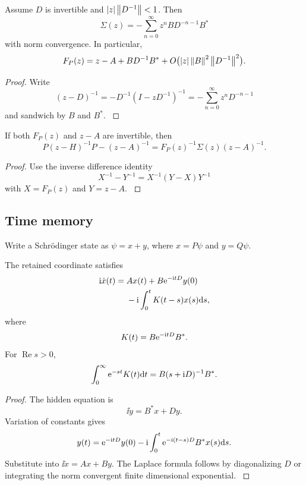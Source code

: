 \begin{proposition}\label{strong:proposition:005}\label{strong:prop:low_energy_expansion}
Assume \(D\) is invertible and \(\left\lvert z\right\rvert\left\lVert D^{-1}\right\rVert<1\). Then
\[
\Sigma(z)
=-
\sum_{n=0}^{\infty}
z^nBD^{-n-1}B^*
\]
with norm convergence. In particular,
\[
F_P(z)
=
 z-A+BD^{-1}B^*+O\bigl(\left\lvert z\right\rvert\left\lVert B\right\rVert^2\left\lVert D^{-1}\right\rVert^2\bigr).
\]
\end{proposition}

\begin{proof}\label{strong:proof:048}
Write
\[
(z-D)^{-1}
=-D^{-1}(I-zD^{-1})^{-1}
=-\sum_{n=0}^{\infty}z^nD^{-n-1}
\]
and sandwich by \(B\) and \(B^*\).
\label{strong:proof:048:end}\end{proof}

\begin{proposition}\label{strong:proposition:006}\label{strong:prop:bare_truncation}
If both \(F_P(z)\) and \(z-A\) are invertible, then
\[
P(z-H)^{-1}P-(z-A)^{-1}
=
F_P(z)^{-1}\Sigma(z)(z-A)^{-1}.
\]
\end{proposition}

\begin{proof}\label{strong:proof:049}
Use the inverse difference identity
\[
X^{-1}-Y^{-1}=X^{-1}(Y-X)Y^{-1}
\]
with \(X=F_P(z)\) and \(Y=z-A\).
\label{strong:proof:049:end}\end{proof}

\subsection{Time memory}\label{strong:subsec:time_memory}

Write a Schrödinger state as \(\psi=x+y\), where \(x=P\psi\) and \(y=Q\psi\).

\begin{theorem}\label{strong:theorem:032}\label{strong:thm:memory_equation}
The retained coordinate satisfies
\[
\begin{aligned}
\ii\dot x(t)
={}&Ax(t)+B\e^{-\ii tD}y(0)\\
&-\ii\int_0^tK(t-s)x(s)\dd s,
\end{aligned}
\]
where
\[
K(t)=B\e^{-\ii tD}B^*.
\]
For \(\operatorname{Re}s>0\),
\[
\int_0^\infty\e^{-st}K(t)\dd t
=
B(s+\ii D)^{-1}B^*.
\]
\end{theorem}

\begin{proof}\label{strong:proof:050}
The hidden equation is
\[
\ii\dot y=B^*x+Dy.
\]
Variation of constants gives
\[
y(t)=\e^{-\ii tD}y(0)
-\ii\int_0^t\e^{-\ii(t-s)D}B^*x(s)\dd s.
\]
Substitute into \(\ii\dot x=Ax+By\). The Laplace formula follows by diagonalizing \(D\) or integrating the norm convergent finite dimensional exponential.
\label{strong:proof:050:end}\end{proof}

